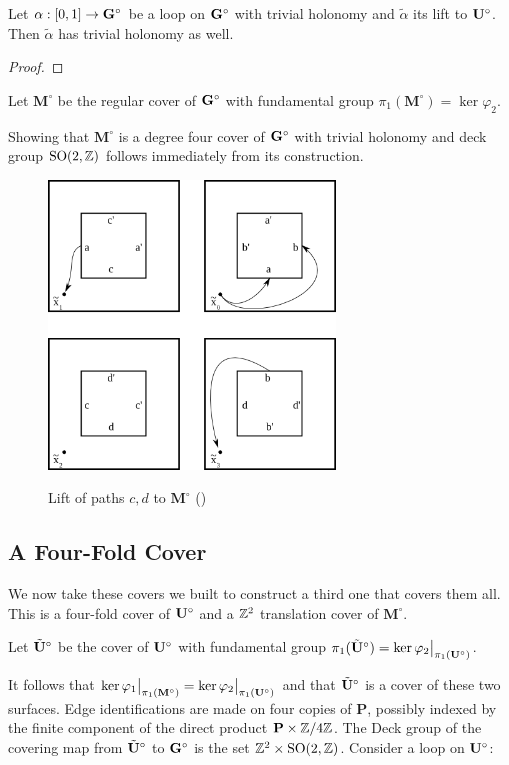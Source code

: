 \documentclass[]{article}
\def\bMs{\mathbf{M}^\circ}
\def\btUs{\btU^\circ}
\def\SO{\mathrm{SO}}
\begin{document}
\begin{cor}
Let $\alpha:[0,1]\rightarrow\mathbf{G}^\circ$ be a loop on $\mathbf{G}^\circ$ with trivial holonomy and $\tilde{\alpha}$ its lift to $\mathbf{U}^\circ$. Then $\tilde{\alpha}$ has trivial holonomy as well.
\begin{proof}

\end{proof}
\end{cor} 

\begin{Def}
Let $\bMs$ be the regular cover of $\mathbf{G}^\circ$ with fundamental group $\pi_1(\bMs)=\ker\varphi_2$.
\end{Def}
Showing that $\bMs$ is a degree four cover of $\mathbf{G}^\circ$ with trivial holonomy and deck group $\SO(2,\ZZ)$ follows immediately from its construction.
\begin{figure}[H]
\centering
\includegraphics[width=3in]{monogroup.png}
\label{fig:arbitrarylift}
\caption{Lift of paths $c,d$ to $\bMs$ ()}
\end{figure}


\subsection{A Four-Fold Cover}
We now take these covers we built to construct a third one that covers them all. This is a four-fold cover of $\mathbf{U}^\circ$ and a $\mathbb{Z}^2$ translation cover of $\bMs$. 
\begin{Def}
Let $\btUs$ be the cover of $\mathbf{U}^\circ$ with fundamental group $\pi_1(\btUs)=\ker\varphi_2\big\vert_{\pi_1(\bUs)}$.
\end{Def}

It follows that $\ker\varphi_1\big\vert_{\pi_1(\bMs)}=\ker\varphi_2\big\vert_{\pi_1(\bUs)}$ and that $\btUs$ is a cover of these two surfaces. Edge identifications are made on four copies of $\mathbf{P}$, possibly indexed by the finite component of the direct product $\mathbf{P}\times\mathbb{Z}/4\mathbb{Z}$. The Deck group of the covering map from $\btUs$ to $\mathbf{G}^\circ$ is the set $\ZZ^2\times \SO(2,\ZZ)$. Consider a loop on $\mathbf{U}^\circ$:
\end{document}
